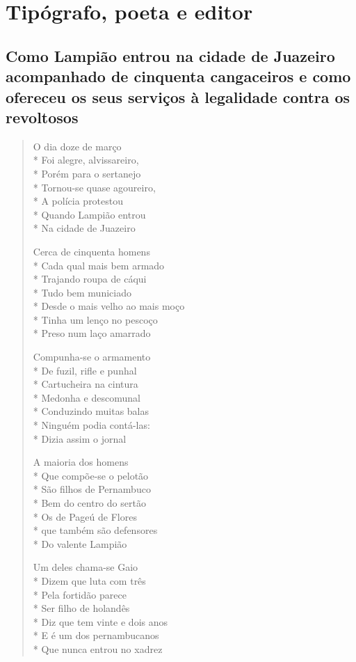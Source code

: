 \part{Tipógrafo, poeta e editor}

\chapter[Como Lampião entrou na cidade
de Juazeiro]{Como Lampião entrou na cidade
de Juazeiro acompanhado de
cinquenta cangaceiros e como
ofereceu os seus serviços à
legalidade contra os revoltosos}

\begin{verse}

O dia doze de março\\*
Foi alegre, alvissareiro,\\*
Porém para o sertanejo\\*
Tornou-se quase agoureiro,\\*
A polícia protestou\\*
Quando Lampião entrou\\*
Na cidade de Juazeiro

Cerca de cinquenta homens\\*
Cada qual mais bem armado\\*
Trajando roupa de cáqui\\*
Tudo bem municiado\\*
Desde o mais velho ao mais moço\\*
Tinha um lenço no pescoço\\*
Preso num laço amarrado

Compunha-se o armamento\\*
De fuzil, rifle e punhal\\*
Cartucheira na cintura\\*
Medonha e descomunal\\*
Conduzindo muitas balas\\*
Ninguém podia contá-las:\\*
Dizia assim o jornal

A maioria dos homens\\*
Que compõe-se o pelotão\\*
São filhos de Pernambuco\\*
Bem do centro do sertão\\*
Os de Pageú de Flores\\*
que também são defensores\\*
Do valente Lampião

Um deles chama-se Gaio\\*
Dizem que luta com três\\*
Pela fortidão parece\\*
Ser filho de holandês\\*
Diz que tem vinte e dois anos\\*
E é um dos pernambucanos\\*
Que nunca entrou no xadrez


\end{verse}
